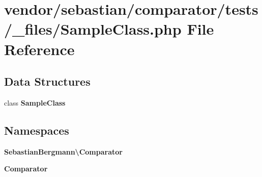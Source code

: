 \section{vendor/sebastian/comparator/tests/\+\_\+files/\+Sample\+Class.php File Reference}
\label{sebastian_2comparator_2tests_2__files_2_sample_class_8php}
\subsection*{Data Structures}
\begin{DoxyCompactItemize}
\item 
class {\bf Sample\+Class}
\end{DoxyCompactItemize}
\subsection*{Namespaces}
\begin{DoxyCompactItemize}
\item 
 {\bf Sebastian\+Bergmann\textbackslash{}\+Comparator}
\item 
 {\bf Comparator}
\end{DoxyCompactItemize}
